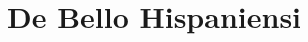 \pagebreak

\section{De Bello Hispaniensi}



\clearpage



\clearpage

\listoffigures

\listoftables



